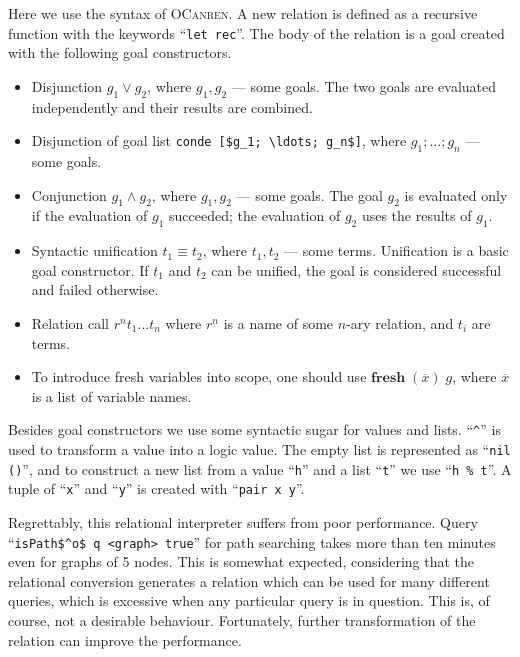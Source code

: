 Here we use the syntax of \textsc{OCanren}. 
A new relation is defined as a recursive function with the keywords ``\lstinline{let rec}''. 
The body of the relation is a goal created with the following goal constructors. 

\begin{itemize}
    \item Disjunction $g_1 \vee g_2$, where $g_1, g_2$ --- some goals. The two goals are evaluated independently and their results are combined.
    \item Disjunction of goal list \lstinline{conde [$g_1; \ldots; g_n$]}, where $g_1; \ldots; g_n$ --- some goals.
    \item Conjunction $g_1 \wedge g_2$, where $g_1, g_2$ --- some goals. The goal $g_2$ is evaluated only if the evaluation of $g_1$ succeeded; the evaluation of $g_2$ uses the results of $g_1$.
    \item Syntactic unification  $t_1 \equiv t_2$, where $t_1, t_2$ --- some terms. Unification is a basic goal constructor. If $t_1$ and $t_2$ can be unified, the goal is considered successful and failed otherwise. 
    \item Relation call $r^n t_1 \dots t_n$ where $r^n$ is a name of some $n$-ary relation, and $t_i$ are terms. 
    \item To introduce fresh variables into scope, one should use $\textbf{fresh} \; (\overline{x}) \; g$, where $\overline{x}$ is a list of variable names.
\end{itemize}

Besides goal constructors we use some syntactic sugar for values and lists. 
``\lstinline{^}'' is used to transform a value into a logic value. 
The empty list is represented as ``\lstinline{nil ()}'', and to construct a new list from a value ``\lstinline{h}'' and a list ``\lstinline{t}'' we use ``\lstinline{h % t}''.
A tuple of ``\lstinline{x}'' and ``\lstinline{y}'' is created with ``\lstinline{pair x y}''.

Regrettably, this relational interpreter suffers from poor performance. 
Query ``\lstinline{isPath$^o$ q <graph> true}'' for path searching takes more than ten minutes even for graphs of 5 nodes. 
This is somewhat expected, considering that the relational conversion generates a relation which can be used for many different queries, which is excessive when any particular query is in question. 
This is, of course, not a desirable behaviour. Fortunately, further transformation of the relation can improve the performance. 


